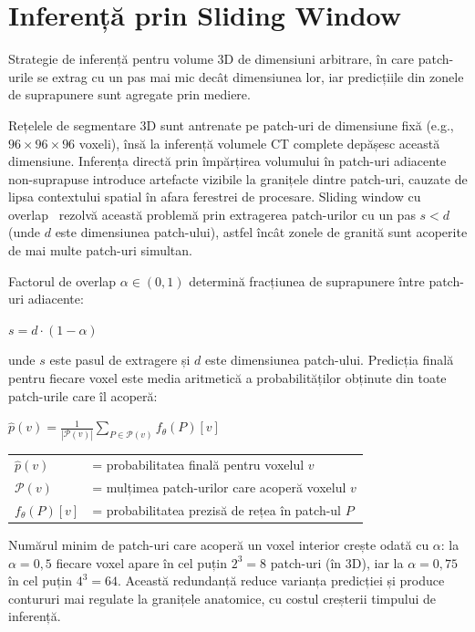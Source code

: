 \documentclass[12pt, a4paper]{report}
\newcommand{\formula}[1]{%
    \begin{center}
        \colorbox{codebackground}{%
            \parbox{0.88\textwidth}{\centering\vspace{4pt}$#1$\vspace{4pt}}%
        }
    \end{center}
}
\begin{document}
\section{Inferență prin Sliding Window}
\label{sec:overlap}

\vspace{4pt}
\begin{infobox}
Strategie de inferență pentru volume 3D de dimensiuni arbitrare,
în care patch-urile se extrag cu un pas mai mic decât dimensiunea lor,
iar predicțiile din zonele de suprapunere sunt agregate prin mediere.
\end{infobox}

Rețelele de segmentare 3D sunt antrenate pe patch-uri de dimensiune
fixă (e.g., $96 \times 96 \times 96$ voxeli), însă la inferență
volumele CT complete depășesc această dimensiune. Inferența directă
prin împărțirea volumului în patch-uri adiacente non-suprapuse
introduce artefacte vizibile la granițele dintre patch-uri, cauzate
de lipsa contextului spatial în afara ferestrei de procesare.
Sliding window cu overlap~\cite{isensee2019automated, cardoso2022monai} rezolvă această problemă prin extragerea
patch-urilor cu un pas $s < d$ (unde $d$ este dimensiunea patch-ului),
astfel încât zonele de granită sunt acoperite de mai multe patch-uri
simultan.

Factorul de overlap $\alpha \in (0, 1)$ determină fracțiunea de
suprapunere între patch-uri adiacente:

\formula{
    s = d \cdot (1 - \alpha)
}

unde $s$ este pasul de extragere și $d$ este dimensiunea patch-ului.
Predicția finală pentru fiecare voxel este media aritmetică a
probabilităților obținute din toate patch-urile care îl acoperă:

\formula{
    \hat{p}(v) = \frac{1}{|\mathcal{P}(v)|}
    \sum_{P \in \mathcal{P}(v)} f_\theta(P)[v]
}

\begin{center}
\begin{tabular}{ll}
    $\hat{p}(v)$        & = probabilitatea finală pentru voxelul $v$ \\
    $\mathcal{P}(v)$    & = mulțimea patch-urilor care acoperă voxelul $v$ \\
    $f_\theta(P)[v]$    & = probabilitatea prezisă de rețea în patch-ul $P$ \\
\end{tabular}
\end{center}

Numărul minim de patch-uri care acoperă un voxel interior crește
odată cu $\alpha$: la $\alpha = 0{,}5$ fiecare voxel apare în cel
puțin $2^3 = 8$ patch-uri (în 3D), iar la $\alpha = 0{,}75$ în cel
puțin $4^3 = 64$. Această redundanță reduce varianța predicției și
produce contururi mai regulate la granițele anatomice, cu costul
creșterii timpului de inferență.
\end{document}

